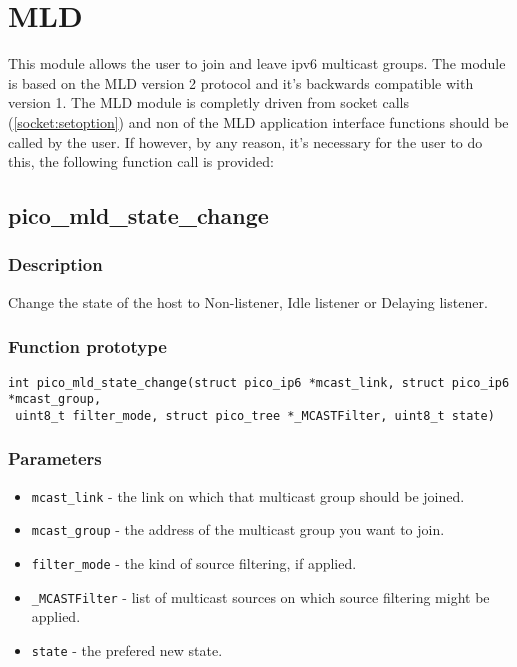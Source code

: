 \section{MLD}

This module allows the user to join and leave ipv6 multicast groups. The module is based on the MLD version 2 protocol and it's backwards compatible with version 1. 
The MLD module is completly driven from socket calls (\ref{socket:setoption}) and non of the MLD application interface functions should be called by the user. If however, by any reason, it's necessary for the user to do this, the following function call is provided:

\subsection{pico\_mld\_state\_change}

\subsubsection*{Description}
Change the state of the host to Non-listener, Idle listener or Delaying listener.

\subsubsection*{Function prototype}
\begin{verbatim}
int pico_mld_state_change(struct pico_ip6 *mcast_link, struct pico_ip6 *mcast_group,
 uint8_t filter_mode, struct pico_tree *_MCASTFilter, uint8_t state)
\end{verbatim}

\subsubsection*{Parameters}
\begin{itemize}[noitemsep]
\item \texttt{mcast\_link} - the link on which that multicast group should be joined.
\item \texttt{mcast\_group} - the address of the multicast group you want to join.
\item \texttt{filter\_mode} - the kind of source filtering, if applied.
\item \texttt{\_MCASTFilter} - list of multicast sources on which source filtering might be applied. 
\item \texttt{state} - the prefered new state.
\end{itemize}

